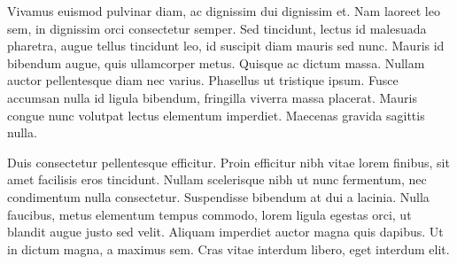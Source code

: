 Vivamus euismod pulvinar diam, ac dignissim dui dignissim et. Nam laoreet leo sem, in dignissim orci consectetur semper. Sed tincidunt, lectus id malesuada pharetra, augue tellus tincidunt leo, id suscipit diam mauris sed nunc. Mauris id bibendum augue, quis ullamcorper metus. Quisque ac dictum massa. Nullam auctor pellentesque diam nec varius. Phasellus ut tristique ipsum. Fusce accumsan nulla id ligula bibendum, fringilla viverra massa placerat. Mauris congue nunc volutpat lectus elementum imperdiet. Maecenas gravida sagittis nulla.

Duis consectetur pellentesque efficitur. Proin efficitur nibh vitae lorem finibus, sit amet facilisis eros tincidunt. Nullam scelerisque nibh ut nunc fermentum, nec condimentum nulla consectetur. Suspendisse bibendum at dui a lacinia. Nulla faucibus, metus elementum tempus commodo, lorem ligula egestas orci, ut blandit augue justo sed velit. Aliquam imperdiet auctor magna quis dapibus. Ut in dictum magna, a maximus sem. Cras vitae interdum libero, eget interdum elit. 